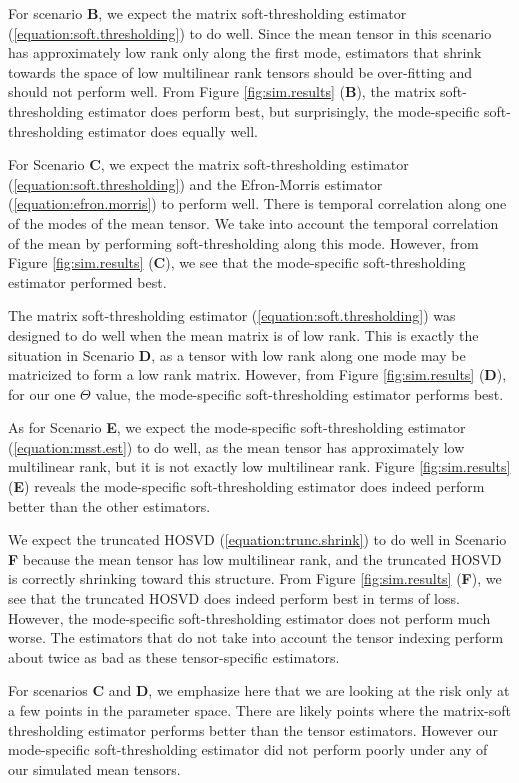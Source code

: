 For scenario \textbf{B}, we expect the matrix soft-thresholding
estimator (\ref{equation:soft.thresholding}) to do well. Since the
mean tensor in this scenario has approximately low rank only along the
first mode, estimators that shrink towards the space of low
multilinear rank tensors should be over-fitting and should not perform
well. From Figure \ref{fig:sim.results} (\textbf{B}), the matrix
soft-thresholding estimator does perform best, but surprisingly, the
mode-specific soft-thresholding estimator does equally well.

For Scenario \textbf{C}, we expect the matrix soft-thresholding
estimator (\ref{equation:soft.thresholding}) and the Efron-Morris
estimator (\ref{equation:efron.morris}) to perform well. There is
temporal correlation along one of the modes of the mean tensor. We
take into account the temporal correlation of the mean by performing
soft-thresholding along this mode. However, from Figure
\ref{fig:sim.results} (\textbf{C}), we see that the mode-specific
soft-thresholding estimator performed best.

The matrix soft-thresholding estimator
(\ref{equation:soft.thresholding}) was designed to do well when the
mean matrix is of low rank. This is exactly the situation in Scenario
\textbf{D}, as a tensor with low rank along one mode may be matricized
to form a low rank matrix. However, from Figure \ref{fig:sim.results}
(\textbf{D}), for our one $\Theta$ value, the mode-specific
soft-thresholding estimator performs best.

As for Scenario \textbf{E}, we expect the mode-specific
soft-thresholding estimator (\ref{equation:msst.est}) to do well, as
the mean tensor has approximately low multilinear rank, but it is not
exactly low multilinear rank. Figure \ref{fig:sim.results}
(\textbf{E}) reveals the mode-specific soft-thresholding estimator
does indeed perform better than the other estimators.

We expect the truncated HOSVD (\ref{equation:trunc.shrink}) to do well
in Scenario \textbf{F} because the mean tensor has low multilinear
rank, and the truncated HOSVD is correctly shrinking toward this
structure. From Figure \ref{fig:sim.results} (\textbf{F}), we see that
the truncated HOSVD does indeed perform best in terms of
loss. However, the mode-specific soft-thresholding estimator does not
perform much worse. The estimators that do not take into account the
tensor indexing perform about twice as bad as these tensor-specific
estimators.

For scenarios \textbf{C} and \textbf{D}, we emphasize here that we are
looking at the risk only at a few points in the parameter space. There
are likely points where the matrix-soft thresholding estimator
performs better than the tensor estimators. However our mode-specific
soft-thresholding estimator did not perform poorly under any of our
simulated mean tensors.



